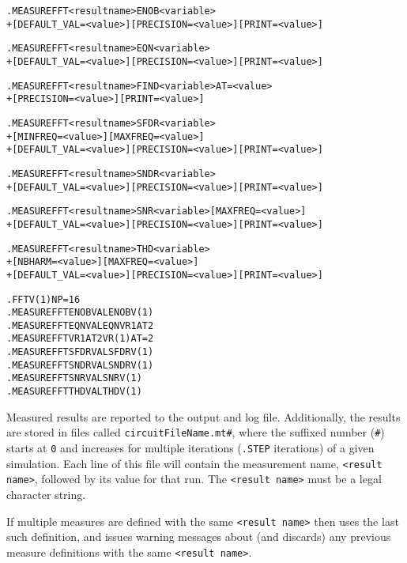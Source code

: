 \begin{Command}
\format
\begin{alltt}
.MEASURE FFT <result name> ENOB <variable>
+ [DEFAULT_VAL=<value>] [PRECISION=<value>] [PRINT=<value>]

.MEASURE FFT <result name> EQN <variable>
+ [DEFAULT_VAL=<value>] [PRECISION=<value>] [PRINT=<value>]

.MEASURE FFT <result name> FIND <variable> AT=<value>
+ [PRECISION=<value>] [PRINT=<value>]

.MEASURE FFT <result name> SFDR <variable>
+ [MINFREQ=<value>] [MAXFREQ=<value>]
+ [DEFAULT_VAL=<value>] [PRECISION=<value>] [PRINT=<value>]

.MEASURE FFT <result name> SNDR <variable>
+ [DEFAULT_VAL=<value>] [PRECISION=<value>] [PRINT=<value>]

.MEASURE FFT <result name> SNR <variable> [MAXFREQ=<value>]
+ [DEFAULT_VAL=<value>] [PRECISION=<value>] [PRINT=<value>]

.MEASURE FFT <result name> THD <variable>
+ [NBHARM=<value>] [MAXFREQ=<value>]
+ [DEFAULT_VAL=<value>] [PRECISION=<value>] [PRINT=<value>]

\end{alltt}

\examples
\begin{alltt}
.FFT V(1) NP=16
.MEASURE FFT ENOBVAL ENOB V(1)
.MEASURE FFT EQNVAL EQN VR1AT2
.MEASURE FFT VR1AT2 VR(1) AT=2
.MEASURE FFT SFDRVAL SFDR V(1)
.MEASURE FFT SNDRVAL SNDR V(1)
.MEASURE FFT SNRVAL SNR V(1)
.MEASURE FFT THDVAL THD V(1)
\end{alltt}

\arguments

\begin{Arguments}

Measured results are reported to the output and log file.
Additionally, the results are stored in files called
\texttt{circuitFileName.mt\#}, where the suffixed number
(\texttt{\#}) starts at \texttt{0} and increases for multiple
iterations (\texttt{.STEP} iterations) of a given simulation. Each
line of this file will contain the measurement name, \texttt{<result
name>}, followed by its value for that run.  The \texttt{<result
name>} must be a legal \Xyce{} character string.

If multiple measures are defined with the same \texttt{<result name>} then
\Xyce{} uses the last such definition, and issues warning messages about
(and discards) any previous measure definitions with the same
\texttt{<result name>}.


\end{Arguments}
\end{Command}
